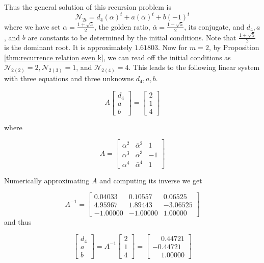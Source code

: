 \documentclass[11pt]{amsart}
\numberwithin{equation}{section}
\theoremstyle{plain}
\begin{document}
Thus the general solution of this recursion problem is 
\begin{displaymath}
\mathcal{N}_{2t}=d_{4}\left(\alpha\right)^{t}
+a\left(\bar{\alpha}\right)^{t}
+b\left(-1\right)^{t}
\end{displaymath}
where we have set  \( \alpha = \frac{1 + \sqrt{5}}{2} \), the golden ratio,  \( \bar{\alpha} = \frac{1 - \sqrt{5}}{2} \), its conjugate, and  $d_{4}, a$, and $b$ are constants to   be determined by the initial conditions.  Note that  $\frac{1+\sqrt{5}}{2}$ is the dominant root. It is approximately 
$1.61803$. Now for $m=2$, by  Proposition \ref{thm:recurrence relation even k},   we can read off the initial conditions  as 
$\mathcal{N}_{2(2)}=2, \mathcal{N}_{2(3)}=1$,
and $\mathcal{N}_{2(4)}=4$. This leads to the following linear system with three  equations and three  unknowns $d_{4}, a, b$. 

\[
A
\begin{bmatrix}
d_4 \\
a \\
b
\end{bmatrix}
=
\begin{bmatrix}
2 \\
1\\
4
\end{bmatrix}
\]


where 


\[
A =
\begin{bmatrix}
\alpha^2 & \bar{\alpha}^2 & 1 \\
\alpha^3 & \bar{\alpha}^3 & -1 \\
\alpha^4 & \bar{\alpha}^4 & 1
\end{bmatrix}
\]

Numerically approximating $A$  and computing its inverse we get 

\[
A^{-1} =
\begin{bmatrix}
0.04033 & 0.10557 & 0.06525 \\
4.95967 & 1.89443 & -3.06525 \\
-1.00000 & -1.00000 & 1.00000
\end{bmatrix}
\]
and thus

\[
\begin{bmatrix}
d_4 \\
a \\
b
\end{bmatrix}
=
A^{-1}
\begin{bmatrix}
2 \\
1 \\
4
\end{bmatrix}
=
\begin{bmatrix}
\phantom{-}0.44721 \\
-0.44721 \\
\phantom{-}1.00000
\end{bmatrix}
\]
\end{document}
